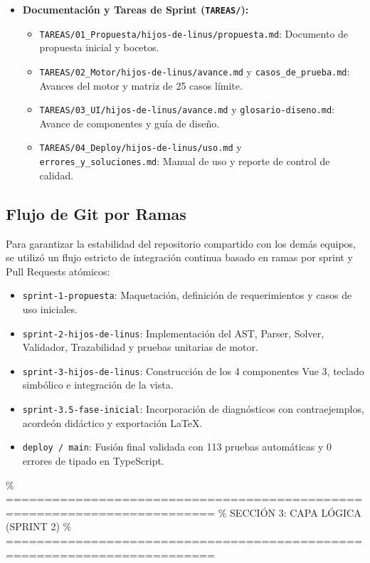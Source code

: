 \documentclass[11pt,a4paper]{article}
\begin{document}
\begin{itemize}[leftmargin=1.2cm]
\begin{itemize}
    \end{itemize}
    \item \textbf{Documentación y Tareas de Sprint (\texttt{TAREAS/}):}
    \begin{itemize}
        \item \texttt{TAREAS/01\_Propuesta/hijos-de-linus/propuesta.md}: Documento de propuesta inicial y bocetos.
        \item \texttt{TAREAS/02\_Motor/hijos-de-linus/avance.md} y \texttt{casos\_de\_prueba.md}: Avances del motor y matriz de 25 casos límite.
        \item \texttt{TAREAS/03\_UI/hijos-de-linus/avance.md} y \texttt{glosario-diseno.md}: Avance de componentes y guía de diseño.
        \item \texttt{TAREAS/04\_Deploy/hijos-de-linus/uso.md} y \texttt{errores\_y\_soluciones.md}: Manual de uso y reporte de control de calidad.
    \end{itemize}
\end{itemize}

\subsection{Flujo de Git por Ramas}
Para garantizar la estabilidad del repositorio compartido con los demás equipos, se utilizó un flujo estricto de integración continua basado en ramas por sprint y Pull Requests atómicos:

\begin{itemize}[leftmargin=1.2cm]
    \item \texttt{sprint-1-propuesta}: Maquetación, definición de requerimientos y casos de uso iniciales.
    \item \texttt{sprint-2-hijos-de-linus}: Implementación del AST, Parser, Solver, Validador, Trazabilidad y pruebas unitarias de motor.
    \item \texttt{sprint-3-hijos-de-linus}: Construcción de los 4 componentes Vue 3, teclado simbólico e integración de la vista.
    \item \texttt{sprint-3.5-fase-inicial}: Incorporación de diagnósticos con contraejemplos, acordeón didáctico y exportación \LaTeX.
    \item \texttt{deploy / main}: Fusión final validada con 113 pruebas automáticas y 0 errores de tipado en TypeScript.
\end{itemize}

\% =========================================================================
\% SECCIÓN 3: CAPA LÓGICA (SPRINT 2)
\% =========================================================================
\newpage
\end{document}
